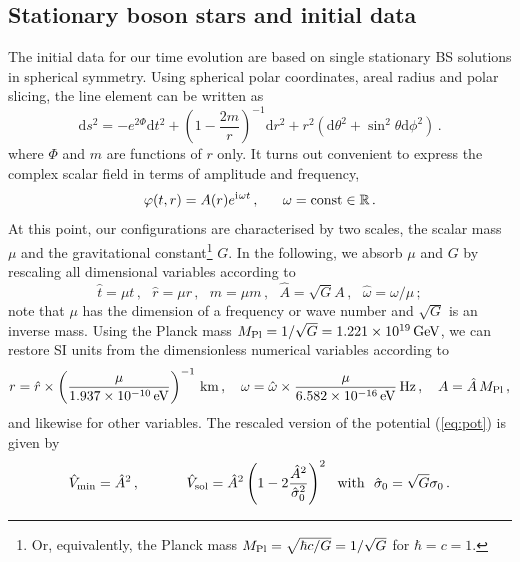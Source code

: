 \documentclass[]{iopart}
\newcommand{\iu}{\mathrm{i}\mkern1mu}
\newcommand{\du}{\mathrm{d}}
\begin{document}
\subsection{Stationary boson stars and initial data}
%
The initial data for our time evolution are based on single stationary
BS solutions in spherical symmetry.  Using spherical polar coordinates,
areal radius and polar slicing, the line element can be written as
%
\begin{equation}
  \du s^2 =
  -e^{2\Phi} \du t^2
  + \left(1-\frac{2m}{r}\right)^{-1} \du r^2
  + r^2
  (
  \du \theta^2
  + \sin^2\theta \du \phi^2
  )\,.
  \label{eq:ds2sym}
\end{equation}
%
where $\Phi$ and $m$ are functions of $r$ only.  It turns out
convenient to express the complex scalar field in terms of amplitude
and frequency,
%
\begin{equation}
  \varphi(t,r) =
  A(r)
  e^{\iu \omega t}\,,~~~~~\omega = \mathrm{const}\in \mathbb{R}\,.
\end{equation}
%
At this point, our configurations are characterised by two scales,
the scalar mass $\mu$ and the gravitational constant\footnote{Or,
equivalently, the Planck mass $M_{\rm Pl}=\sqrt{\hbar c/G}=1/\sqrt{G}$
for $\hbar=c=1$.} $G$.  In the following, we absorb $\mu$ and $G$
by rescaling all dimensional variables according to
%
\begin{equation}
  \hat{t}=\mu t\,,~~~
  \hat{r}=\mu r\,,~~~
  \hat{m}=\mu m\,,~~~
  \hat{A}=\sqrt{G} A\,,~~~
  \hat{\omega}=\omega/\mu\,;
  \label{eq:rescaling}
\end{equation}
%
note that $\mu$ has the dimension of a frequency or wave number and
$\sqrt{G}$ is an inverse mass. Using the Planck mass $M_{\rm
Pl}=1/\sqrt{G}=1.221\times10^{19}\,{\rm GeV}$, we can restore SI
units from the dimensionless numerical variables according to
%
\begin{equation}
  r = \hat{r} \times
  \left(
  \frac{\mu}{1.937\times 10^{-10}\,{\rm eV}}
  \right)^{-1}\,{\rm km}\,,~~~
  \omega = \hat{\omega}\times
  \frac{\mu}{6.582\times 10^{-16}\,{\rm eV}}\,{\rm Hz}
  \,,~~~
  A=\hat{A}\,M_{\rm Pl}\,,
  \nonumber
\end{equation}
%
and likewise for other variables. The rescaled version of the
potential (\ref{eq:pot}) is given by
%
\begin{equation}
  \hat{V}_{\rm min} = \hat{A}^2\,,~~~~~~~~~~
  \hat{V}_{\rm sol} =
  \hat{A}^2
  \left(
  1-2\frac{\hat{A}^2}{\hat{\sigma}_0^2}
  \right)^2~~\text{with}~~\hat{\sigma}_0=\sqrt{G}\sigma_0\,.
  \label{eq:potentials}
\end{equation}
\end{document}
